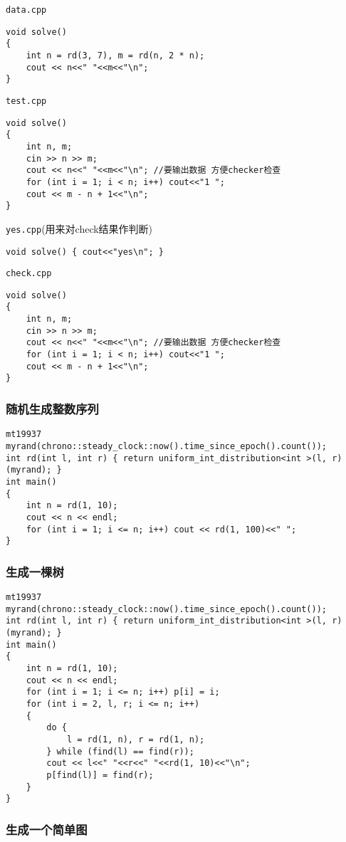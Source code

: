 \documentclass[a4paper, fontset=none]{ctexart}
\begin{document}
\texttt{data.cpp}
\begin{verbatim}
void solve()
{
    int n = rd(3, 7), m = rd(n, 2 * n);
    cout << n<<" "<<m<<"\n";
}
\end{verbatim}

\texttt{test.cpp}
\begin{verbatim}
void solve()
{
    int n, m;
    cin >> n >> m;
    cout << n<<" "<<m<<"\n"; //要输出数据 方便checker检查
    for (int i = 1; i < n; i++) cout<<"1 ";
    cout << m - n + 1<<"\n";
}
\end{verbatim}

\texttt{yes.cpp}(用来对check结果作判断)
\begin{verbatim}
void solve() { cout<<"yes\n"; }
\end{verbatim}

\texttt{check.cpp}
\begin{verbatim}
void solve()
{
    int n, m;
    cin >> n >> m;
    cout << n<<" "<<m<<"\n"; //要输出数据 方便checker检查
    for (int i = 1; i < n; i++) cout<<"1 ";
    cout << m - n + 1<<"\n";
}
\end{verbatim}
\subsubsection{随机生成整数序列}

\begin{verbatim}
mt19937 myrand(chrono::steady_clock::now().time_since_epoch().count());
int rd(int l, int r) { return uniform_int_distribution<int >(l, r)(myrand); }
int main()
{
    int n = rd(1, 10);
    cout << n << endl;
    for (int i = 1; i <= n; i++) cout << rd(1, 100)<<" ";
}
\end{verbatim}
\subsubsection{生成一棵树}

\begin{verbatim}
mt19937 myrand(chrono::steady_clock::now().time_since_epoch().count());
int rd(int l, int r) { return uniform_int_distribution<int >(l, r)(myrand); }
int main()
{
    int n = rd(1, 10);
    cout << n << endl;
    for (int i = 1; i <= n; i++) p[i] = i;
    for (int i = 2, l, r; i <= n; i++)
    {
        do {
            l = rd(1, n), r = rd(1, n);
        } while (find(l) == find(r));
        cout << l<<" "<<r<<" "<<rd(1, 10)<<"\n";
        p[find(l)] = find(r);
    }
}
\end{verbatim}
\subsubsection{生成一个简单图}
\end{document}
